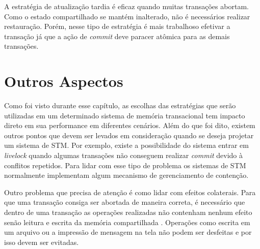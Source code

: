 A estratégia de atualização tardia é eficaz quando muitas transações abortam. Como o estado compartilhado se mantém inalterado, não é necessários realizar restauração. Porém, nesse tipo de estratégia é mais trabalhoso efetivar a transação já que a ação de \emph{commit} deve paracer atômica para as demais transações.


\section{Outros Aspectos}

Como foi visto durante esse capítulo, as escolhas das estratégias que serão utilizadas em um determinado sistema de memória transacional tem impacto direto em sua performance em diferentes cenários. Além do que foi dito, existem outros pontos que devem ser levados em consideração quando se deseja projetar um sistema de STM. Por exemplo, existe a possibilidade do sistema entrar em \emph{livelock} quando algumas transações não conseguem realizar \emph{commit} devido à conflitos repetidos. Para lidar com esse tipo de problema os sistemas de STM normalmente implementam algum mecanismo de gerenciamento de contenção. \cite{spear2006conflict}

Outro problema que precisa de atenção é como lidar com efeitos colaterais. Para que uma transação consiga ser abortada de maneira correta, é necessário que dentro de uma transação as operações realizadas não contenham nenhum efeito senão leitura e escrita da memória compartilhada \cite{jones2007beautiful}. Operações como escrita em um arquivo ou a impressão de mensagem na tela não podem ser desfeitas e por isso devem ser evitadas.